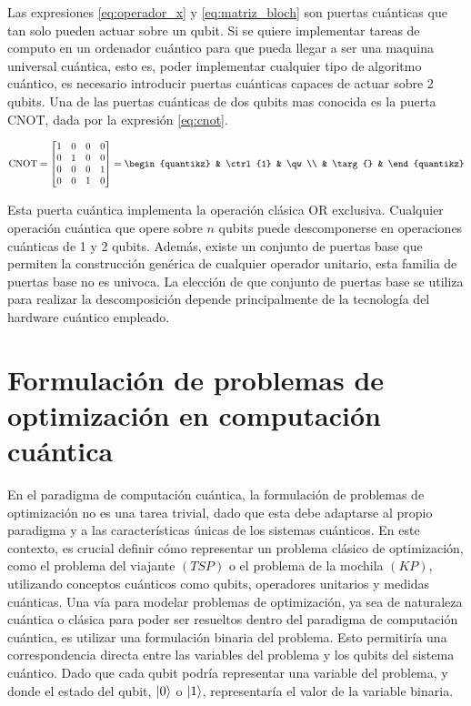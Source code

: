Las expresiones \ref{eq:operador_x} y \ref{eq:matriz_bloch} son puertas cuánticas que tan solo pueden actuar sobre un qubit. Si se quiere implementar tareas de computo en un ordenador cuántico para que pueda llegar a ser una maquina universal cuántica, esto es, poder implementar cualquier tipo de algoritmo cuántico, es necesario introducir puertas cuánticas capaces de actuar sobre 2 qubits. Una de las puertas cuánticas de dos qubits mas conocida es la puerta CNOT, dada por la expresión \ref{eq:cnot}.


\begin{equation}
    \text{CNOT} = \begin{bmatrix}
    1 & 0 & 0 & 0 \\
    0 & 1 & 0 & 0 \\
    0 & 0 & 0 & 1 \\
    0 & 0 & 1 & 0 \\
    \end{bmatrix} = 
    \begin{quantikz}
     &  \ctrl{1}      &  \qw \\
     &  \targ{}       & 
    \end{quantikz}
    \label{eq:cnot}
\end{equation}

\newpage

Esta puerta cuántica implementa la operación clásica OR exclusiva. Cualquier operación cuántica que opere sobre $n$ qubits puede descomponerse en operaciones cuánticas de 1 y 2 qubits. Además, existe un conjunto de puertas base que permiten la construcción genérica de cualquier operador unitario, esta familia de puertas base no es univoca. La elección de que conjunto de puertas base se utiliza para realizar la descomposición depende principalmente de la tecnología del hardware cuántico empleado. 

\section{Formulación de problemas de optimización en computación cuántica}

En el paradigma de computación cuántica, la formulación de problemas de optimización no es una tarea trivial, dado que esta debe adaptarse al propio paradigma y a las características únicas de los sistemas cuánticos. En este contexto, es crucial definir cómo representar un problema clásico de optimización, como el problema del viajante $(TSP)$ o el problema de la mochila  $(KP)$, utilizando conceptos cuánticos como qubits, operadores unitarios y medidas cuánticas. Una vía para modelar problemas de optimización, ya sea de naturaleza cuántica o clásica para poder ser resueltos dentro del paradigma de computación cuántica, es utilizar una formulación binaria del problema. Esto permitiría una correspondencia directa entre las variables del problema y los qubits del sistema cuántico. Dado que cada qubit podría representar una variable del problema, y donde el estado del qubit, $\ket{0}$ o $\ket{1}$, representaría el valor de la variable binaria. \\

